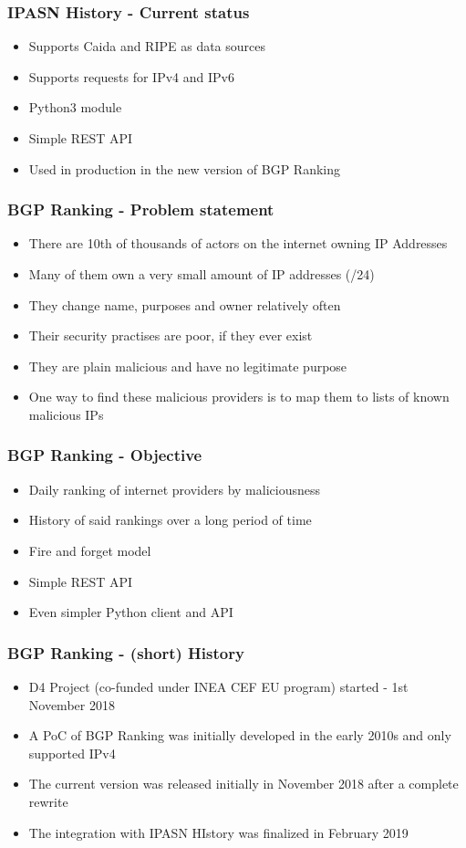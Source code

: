 \documentclass{beamer}
\begin{document}
\begin{frame}
    \frametitle{IPASN History - Current status}
    \begin{itemize}
        \item Supports Caida and RIPE as data sources
        \item Supports requests for IPv4 and IPv6
        \item Python3 module
        \item Simple REST API
        \item Used in production in the new version of BGP Ranking
    \end{itemize}
\end{frame}

\begin{frame}
    \frametitle{BGP Ranking - Problem statement}
    \begin{itemize}
        \item There are 10th of thousands of actors on the internet owning IP Addresses
        \item Many of them own a very small amount of IP addresses (/24)
        \item They change name, purposes and owner relatively often
        \item Their security practises are poor, if they ever exist
        \item They are plain malicious and have no legitimate purpose
        \item One way to find these malicious providers is to map them to lists of known malicious IPs
    \end{itemize}
\end{frame}


\begin{frame}
 \frametitle{BGP Ranking - Objective}
 \begin{itemize}
         \item Daily ranking of internet providers by maliciousness
         \item History of said rankings over a long period of time
         \item Fire and forget model
         \item Simple REST API
         \item Even simpler Python client and API
 \end{itemize}
\end{frame}

\begin{frame}
        \frametitle{BGP Ranking - (short) History}
 \begin{itemize}
        \item D4 Project (co-funded under INEA CEF EU program) started - 1st November 2018
        \item A PoC of BGP Ranking was initially developed in the early 2010s and only supported IPv4
        \item The current version was released initially in November 2018 after a complete rewrite
        \item The integration with IPASN HIstory was finalized in February 2019
 \end{itemize}
\end{frame}
\end{document}
